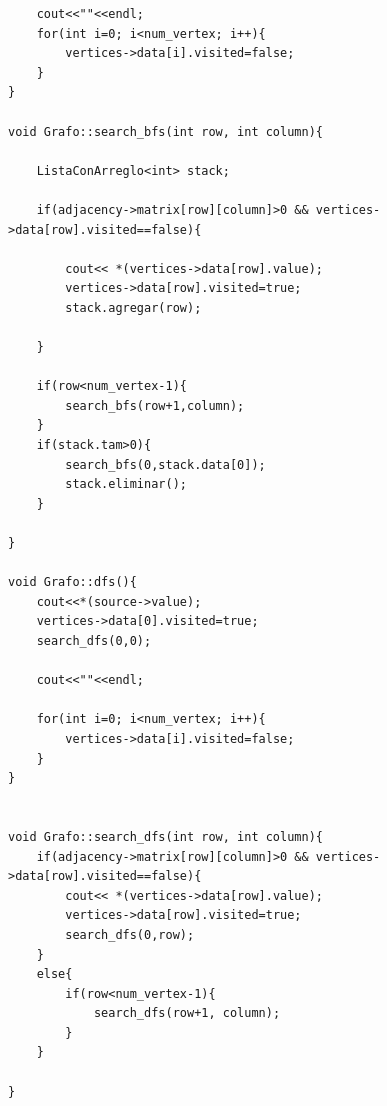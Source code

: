 \documentclass[11pt]{article}
\begin{document}
\begin{lstlisting}
    cout<<""<<endl;
    for(int i=0; i<num_vertex; i++){
        vertices->data[i].visited=false;
    }
}

void Grafo::search_bfs(int row, int column){ 
    
    ListaConArreglo<int> stack;
    
    if(adjacency->matrix[row][column]>0 && vertices->data[row].visited==false){
        
        cout<< *(vertices->data[row].value);
        vertices->data[row].visited=true;
        stack.agregar(row);

    }
    
    if(row<num_vertex-1){
        search_bfs(row+1,column);
    }
    if(stack.tam>0){
        search_bfs(0,stack.data[0]);
        stack.eliminar();
    }
    
}

void Grafo::dfs(){
    cout<<*(source->value);
    vertices->data[0].visited=true;
    search_dfs(0,0);
    
    cout<<""<<endl;
    
    for(int i=0; i<num_vertex; i++){
        vertices->data[i].visited=false;
    }
}


void Grafo::search_dfs(int row, int column){ 
    if(adjacency->matrix[row][column]>0 && vertices->data[row].visited==false){ 
        cout<< *(vertices->data[row].value);
        vertices->data[row].visited=true;
        search_dfs(0,row);
    }
    else{
        if(row<num_vertex-1){
            search_dfs(row+1, column);
        }
    }
    
}




\end{lstlisting}
\end{document}
